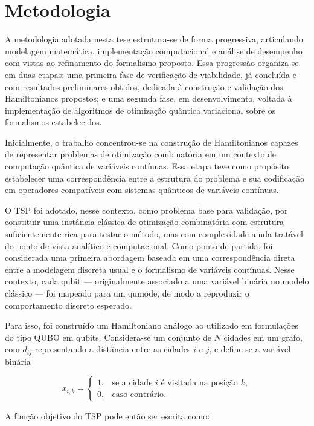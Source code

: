 \chapter{Metodologia} \label{cap:proposta}

A metodologia adotada nesta tese estrutura-se de forma progressiva, articulando modelagem matemática, implementação computacional e análise de desempenho com vistas ao refinamento do formalismo proposto. Essa progressão organiza-se em duas etapas: uma primeira fase de verificação de viabilidade, já concluída e com resultados preliminares obtidos, dedicada à construção e validação dos Hamiltonianos propostos; e uma segunda fase, em desenvolvimento, voltada à implementação de algoritmos de otimização quântica variacional sobre os formalismos estabelecidos.

Inicialmente, o trabalho concentrou-se na construção de Hamiltonianos capazes de representar problemas de otimização combinatória em um contexto de computação quântica de variáveis contínuas. Essa etapa teve como propósito estabelecer uma correspondência entre a estrutura do problema e sua codificação em operadores compatíveis com sistemas quânticos de variáveis contínuas.

O TSP foi adotado, nesse contexto, como problema base para validação, por constituir uma instância clássica de otimização combinatória com estrutura suficientemente rica para testar o método, mas com complexidade ainda tratável do ponto de vista analítico e computacional. Como ponto de partida, foi considerada uma primeira abordagem baseada em uma correspondência direta entre a modelagem discreta usual e o formalismo de variáveis contínuas. Nesse contexto, cada qubit — originalmente associado a uma variável binária no modelo clássico — foi mapeado para um qumode, de modo a reproduzir o comportamento discreto esperado.

Para isso, foi construído um Hamiltoniano análogo ao utilizado em formulações do tipo QUBO em qubits. Considera-se um conjunto de $N$ cidades em um grafo, com $d_{ij}$ representando a distância entre as cidades $i$ e $j$, e define-se a variável binária

$$
x_{i,k} =
\begin{cases}
1, & \text{se a cidade $i$ é visitada na posição $k$},\\
0, & \text{caso contrário}.
\end{cases}
$$

A função objetivo do TSP pode então ser escrita como:

